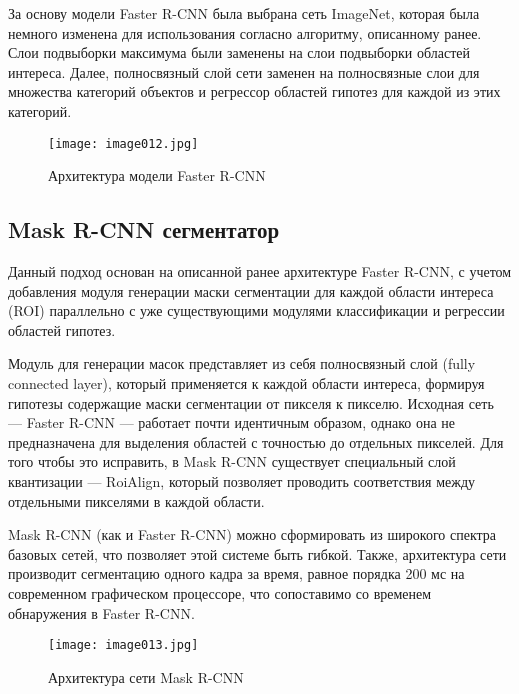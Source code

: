 За основу модели Faster R-CNN была выбрана сеть ImageNet, которая была немного изменена для использования согласно алгоритму, описанному ранее. Слои подвыборки максимума были заменены на слои подвыборки областей интереса. Далее, полносвязный слой сети заменен на полносвязные слои для множества категорий объектов и регрессор областей гипотез для каждой из этих категорий.
\begin{figure}[htbp]
\centering
\texttt{[image: image012.jpg]}
\caption{Архитектура модели Faster R-CNN\cite{fifteen}}%
\label{fig:how-to-do-research}
\end{figure}

\subsection{Mask R-CNN сегментатор}

Данный подход основан на описанной ранее архитектуре Faster R-CNN, с учетом добавления модуля генерации маски сегментации для каждой области интереса (ROI) параллельно с уже существующими модулями классификации и регрессии областей гипотез. 

Модуль для генерации масок представляет из себя полносвязный слой (fully connected layer), который применяется к каждой области интереса, формируя гипотезы содержащие маски сегментации от пикселя к пикселю. Исходная сеть — Faster R-CNN — работает почти идентичным образом, однако она не предназначена для выделения областей с точностью до отдельных пикселей. Для того чтобы это исправить, в Mask R-CNN существует специальный слой квантизации — RoiAlign, который позволяет проводить соответствия между отдельными пикселями в каждой области.

Mask R-CNN (как и Faster R-CNN) можно сформировать из широкого спектра базовых сетей, что позволяет этой системе быть гибкой. Также, архитектура сети производит сегментацию одного кадра за время, равное порядка 200 мс на современном графическом процессоре, что сопоставимо со временем обнаружения в Faster R-CNN\cite{sixteen}.
\begin{figure}[htbp]
\centering
\texttt{[image: image013.jpg]}
\caption{Архитектура сети Mask R-CNN\cite{sixteen}}%
\label{fig:how-to-do-research}
\end{figure}

